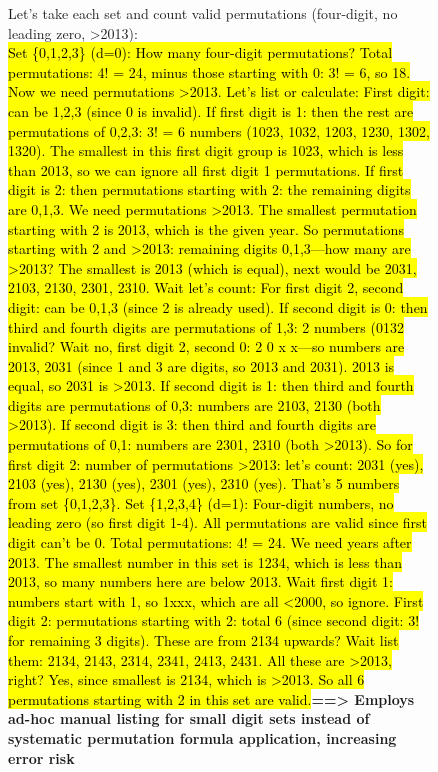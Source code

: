 \begin{figure}[!ht]
\begin{lrbox}{\DSRPrompt}
\begin{promptbox}
Let's take each set and count valid permutations (four-digit, no leading zero, >2013):\\
\hl{Set \{0,1,2,3\} (d=0): How many four-digit permutations? Total permutations: 4! = 24, minus those starting with 0: 3! = 6, so 18. Now we need permutations >2013. Let's list or calculate: First digit: can be 1,2,3 (since 0 is invalid). If first digit is 1: then the rest are permutations of 0,2,3: 3! = 6 numbers (1023, 1032, 1203, 1230, 1302, 1320). The smallest in this first digit group is 1023, which is less than 2013, so we can ignore all first digit 1 permutations. If first digit is 2: then permutations starting with 2: the remaining digits are 0,1,3. We need permutations >2013. The smallest permutation starting with 2 is 2013, which is the given year. So permutations starting with 2 and >2013: remaining digits 0,1,3—how many are >2013? The smallest is 2013 (which is equal), next would be 2031, 2103, 2130, 2301, 2310. Wait let's count: For first digit 2, second digit: can be 0,1,3 (since 2 is already used). If second digit is 0: then third and fourth digits are permutations of 1,3: 2 numbers (0132 invalid? Wait no, first digit 2, second 0: 2 0 x x—so numbers are 2013, 2031 (since 1 and 3 are digits, so 2013 and 2031). 2013 is equal, so 2031 is >2013. If second digit is 1: then third and fourth digits are permutations of 0,3: numbers are 2103, 2130 (both >2013). If second digit is 3: then third and fourth digits are permutations of 0,1: numbers are 2301, 2310 (both >2013). So for first digit 2: number of permutations >2013: let's count: 2031 (yes), 2103 (yes), 2130 (yes), 2301 (yes), 2310 (yes). That's 5 numbers from set \{0,1,2,3\}.
Set \{1,2,3,4\} (d=1): Four-digit numbers, no leading zero (so first digit 1-4). All permutations are valid since first digit can't be 0. Total permutations: 4! = 24. We need years after 2013. The smallest number in this set is 1234, which is less than 2013, so many numbers here are below 2013. Wait first digit 1: numbers start with 1, so 1xxx, which are all <2000, so ignore. First digit 2: permutations starting with 2: total 6 (since second digit: 3! for remaining 3 digits). These are from 2134 upwards? Wait list them: 2134, 2143, 2314, 2341, 2413, 2431. All these are >2013, right? Yes, since smallest is 2134, which is >2013. So all 6 permutations starting with 2 in this set are valid.}\textbf{==> Employs ad-hoc manual listing for small digit sets instead of systematic permutation formula application, increasing error risk}\\

\end{promptbox}
\end{lrbox}
\end{figure}
